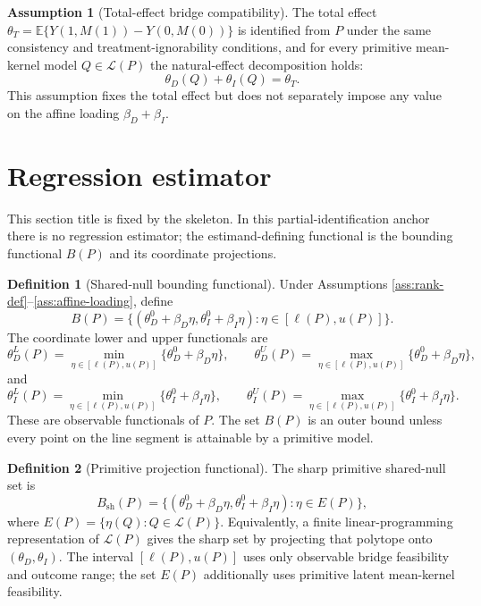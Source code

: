 \documentclass[11pt]{article}
\newcommand{\E}{\mathbb{E}}
\theoremstyle{definition}
\newtheorem{definition}{Definition}
\newtheorem{assumption}{Assumption}
\theoremstyle{plain}
\theoremstyle{remark}
\begin{document}
\begin{assumption}[Total-effect bridge compatibility]\label{ass:total-effect}
The total effect \(\theta_T=\E\{Y(1,M(1))-Y(0,M(0))\}\) is identified from
\(P\) under the same consistency and treatment-ignorability conditions, and for
every primitive mean-kernel model \(Q\in\mathcal L(P)\) the natural-effect
decomposition holds:
\[
  \theta_D(Q)+\theta_I(Q)=\theta_T.
\]
This assumption fixes the total effect but does not separately impose any
value on the affine loading \(\beta_D+\beta_I\).
\end{assumption}

\section{Regression estimator}
This section title is fixed by the skeleton.  In this partial-identification
anchor there is no regression estimator; the estimand-defining functional is
the bounding functional \(B(P)\) and its coordinate projections.

\begin{definition}[Shared-null bounding functional]\label{def:bound}
Under Assumptions \ref{ass:rank-def}--\ref{ass:affine-loading}, define
\[
  B(P)=\{(\theta_D^0+\beta_D\eta,\theta_I^0+\beta_I\eta):
       \eta\in[\ell(P),u(P)]\}.
\]
The coordinate lower and upper functionals are
\[
  \theta_D^L(P)=\min_{\eta\in[\ell(P),u(P)]}
       \{\theta_D^0+\beta_D\eta\},
  \qquad
  \theta_D^U(P)=\max_{\eta\in[\ell(P),u(P)]}
       \{\theta_D^0+\beta_D\eta\},
\]
and
\[
  \theta_I^L(P)=\min_{\eta\in[\ell(P),u(P)]}
       \{\theta_I^0+\beta_I\eta\},
  \qquad
  \theta_I^U(P)=\max_{\eta\in[\ell(P),u(P)]}
       \{\theta_I^0+\beta_I\eta\}.
\]
These are observable functionals of \(P\).  The set \(B(P)\) is an outer bound
unless every point on the line segment is attainable by a primitive model.
\end{definition}

\begin{definition}[Primitive projection functional]\label{def:primitive-proj}
The sharp primitive shared-null set is
\[
  B_{\mathrm{sh}}(P)=
  \{(\theta_D^0+\beta_D\eta,\theta_I^0+\beta_I\eta):\eta\in E(P)\},
\]
where \(E(P)=\{\eta(Q):Q\in\mathcal L(P)\}\).  Equivalently, a finite
linear-programming representation of \(\mathcal L(P)\) gives the sharp set by
projecting that polytope onto \((\theta_D,\theta_I)\).  The interval
\([\ell(P),u(P)]\) uses only observable bridge feasibility and outcome range;
the set \(E(P)\) additionally uses primitive latent mean-kernel feasibility.
\end{definition}
\end{document}
